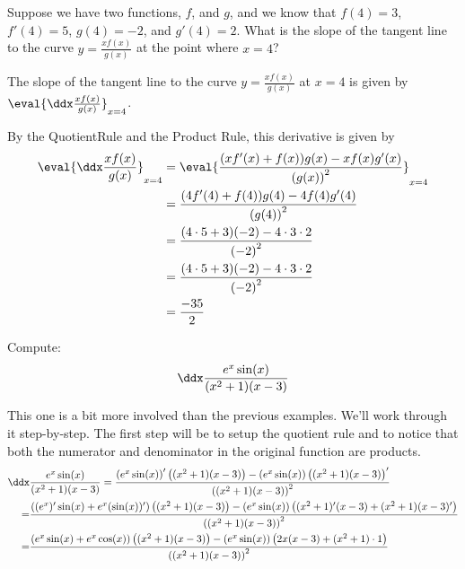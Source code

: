 \documentclass{ximera}
\begin{document}
\begin{example}
	Suppose we have two functions, $f$, and $g$, and we know that $f(4) = 3$, $f'(4) = 5$, $g(4) = -2$, and $g'(4) = 2$.
	What is the slope of the tangent line to the curve $y=\frac{xf(x)}{g(x)}$ at the point where $x = 4$?
	\begin{explanation}
		The slope of the tangent line to the curve  $y=\frac{xf(x)}{g(x)}$ at $x = 4$ is given by $ \eval{\ddx\frac{xf(x)}{g(x)}}_{x=4}$.
	 
		By the QuotientRule and the Product Rule, this derivative is given by 
		\begin{align*}
			\eval{\ddx\frac{xf(x)}{g(x)}}_{x=4} &=\eval{\frac{(xf'(x)+f(x))g(x)-xf(x)g'(x)}{\left(g(x)\right)^2}}_{x=4}\\
				&=\frac{(4f'(4)+f(4))g(4)-4f(4)g'(4)}{\left(g(4)\right)^2}\\
				&=\frac{(4\cdot5+3)(-2)-4\cdot3\cdot2}{\left(-2\right)^2}\\
				&=\frac{(4\cdot5+3)(-2)-4\cdot3\cdot2}{\left(-2\right)^2}\\
				&=\frac{-35}{2}\\
		\end{align*}
	\end{explanation}
\end{example} 


\begin{example}
	Compute:
	\[\ddx \frac{e^x \sin(x)}{(x^2+1)(x-3)} \]
	
	\begin{explanation}
		This one is a bit more involved than the previous examples. We'll work through it step-by-step. The first step will be to setup the 
		quotient rule and to notice that both the numerator and denominator in the original function are products.
		\begin{align*}
			\ddx&\frac{e^x \sin(x)}{(x^2+1)(x-3)} = \dfrac{\left(e^x \sin(x)\right)'\left((x^2+1)(x-3)\right) - \left(e^x \sin(x)\right)\left((x^2+1)(x-3)\right)' }{\left((x^2+1)(x-3)\right)^2} \\
			=& \dfrac{\left((e^x)' \sin(x)+e^x(\sin(x))'\right)\left((x^2+1)(x-3)\right) - \left(e^x \sin(x)\right)\left((x^2+1)'(x-3)+(x^2+1)(x-3)'\right) }{\left((x^2+1)(x-3)\right)^2} \\
			=& \dfrac{\left(e^x \sin(x)+e^x\cos(x)\right)\left((x^2+1)(x-3)\right) - \left(e^x \sin(x)\right)\left(2x(x-3)+(x^2+1)\cdot 1\right) }{\left((x^2+1)(x-3)\right)^2}
		\end{align*}
	\end{explanation}
\end{example}
\end{document}
